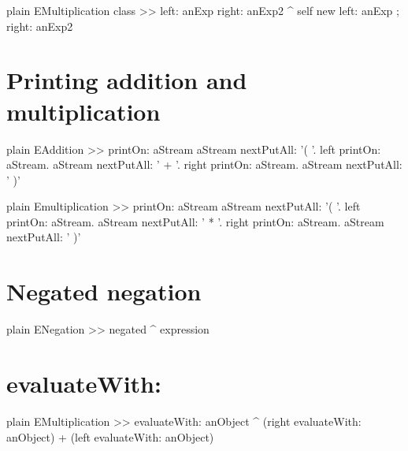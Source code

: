 \documentclass[10pt,twoside,english]{_support/latex/sbabook/sbabook}
\begin{document}
\begin{displaycode}{plain}
EMultiplication class >>	left: anExp right: anExp2
	^ self new left: anExp ; right: anExp2
\end{displaycode}
\section{Printing addition and multiplication}
\begin{displaycode}{plain}
EAddition >> printOn: aStream
	aStream nextPutAll: '( '.
	left printOn: aStream. 
	aStream nextPutAll: ' + '.
	right printOn: aStream.
	aStream nextPutAll: ' )'
\end{displaycode}

\begin{displaycode}{plain}
Emultiplication >> printOn: aStream
	aStream nextPutAll: '( '.
	left printOn: aStream. 
	aStream nextPutAll: ' * '.
	right printOn: aStream.
	aStream nextPutAll: ' )'
\end{displaycode}
\section{Negated negation}
\begin{displaycode}{plain}
ENegation >> negated
	^ expression
\end{displaycode}
\section{evaluateWith:}
\begin{displaycode}{plain}
EMultiplication >> evaluateWith: anObject
	^ (right evaluateWith: anObject) + (left evaluateWith: anObject)
\end{displaycode}


\backmatter



\end{document}
